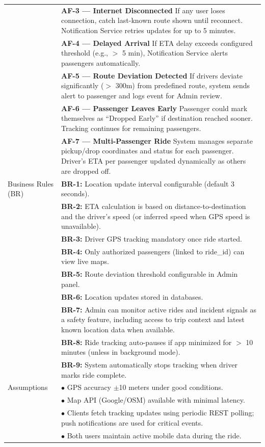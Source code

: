 \begin{longtable}{|>{\raggedright\arraybackslash}p{4cm}|>{\raggedright\arraybackslash}p{11cm}|}
& \textbf{AF-3 — Internet Disconnected} \newline If any user loses connection, catch last-known route shown until reconnect. Notification Service retries updates for up to 5 minutes. \\
& \textbf{AF-4 — Delayed Arrival} \newline If ETA delay exceeds configured threshold (e.g., $>$ 5 min), Notification Service alerts passengers automatically. \\
& \textbf{AF-5 — Route Deviation Detected} \newline If drivers deviate significantly ($>$ 300m) from predefined route, system sends alert to passenger and logs event for Admin review. \\
& \textbf{AF-6 — Passenger Leaves Early} \newline Passenger could mark themselves as ``Dropped Early'' if destination reached sooner. Tracking continues for remaining passengers. \\
& \textbf{AF-7 — Multi-Passenger Ride} \newline System manages separate pickup/drop coordinates and status for each passenger. Driver's ETA per passenger updated dynamically as others are dropped off. \\
\hline
Business Rules (BR) & \textbf{BR-1:} Location update interval configurable (default 3 seconds). \\
& \textbf{BR-2:} ETA calculation is based on distance-to-destination and the driver's speed (or inferred speed when GPS speed is unavailable). \\
& \textbf{BR-3:} Driver GPS tracking mandatory once ride started. \\
& \textbf{BR-4:} Only authorized passengers (linked to ride\_id) can view live maps. \\
& \textbf{BR-5:} Route deviation threshold configurable in Admin panel. \\
& \textbf{BR-6:} Location updates stored in databases. \\
& \textbf{BR-7:} Admin can monitor active rides and incident signals as a safety feature, including access to trip context and latest known location data when available. \\
& \textbf{BR-8:} Ride tracking auto-pauses if app minimized for $>$ 10 minutes (unless in background mode). \\
& \textbf{BR-9:} System automatically stops tracking when driver marks ride complete. \\
\hline
Assumptions & $\bullet$ GPS accuracy $\pm$10 meters under good conditions. \\
& $\bullet$ Map API (Google/OSM) available with minimal latency. \\
& $\bullet$ Clients fetch tracking updates using periodic REST polling; push notifications are used for critical events. \\
& $\bullet$ Both users maintain active mobile data during the ride. \\
\hline
\end{longtable}

